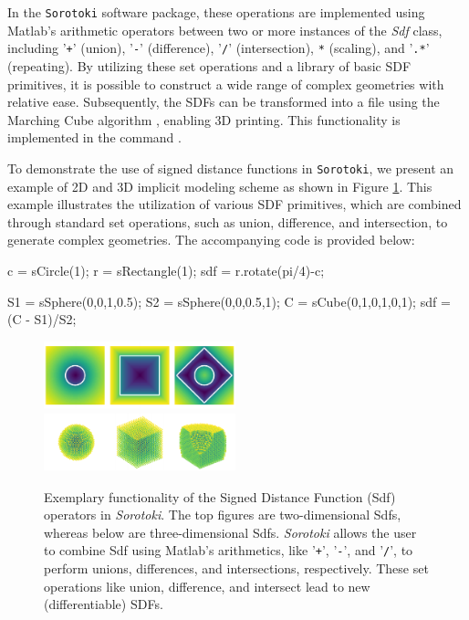 In the \texttt{Sorotoki} software package, these operations are implemented using Matlab's arithmetic operators between two or more instances of the \textit{Sdf} class, including '\texttt{+}' (union), '\texttt{-}' (difference), '\texttt{/}' (intersection), \texttt{*} (scaling), and '\texttt{.*}' (repeating). By utilizing these set operations and a library of basic SDF primitives, it is possible to construct a wide range of complex geometries with relative ease. Subsequently, the SDFs can be transformed into a  file using the Marching Cube algorithm \cite{Lorensen1987Aug}, enabling 3D printing. This functionality is implemented in the command . \\

\begin{example}
To demonstrate the use of signed distance functions in \texttt{Sorotoki}, we present an example of 2D and 3D implicit modeling scheme as shown in Figure \ref{fig:C5:sdfexample}. This example illustrates the utilization of various SDF primitives, which are combined through standard set operations, such as union, difference, and intersection, to generate complex geometries. The accompanying code is provided below:
\end{example}

\begin{matlabcode}
c   = sCircle(1);
r   = sRectangle(1);
sdf = r.rotate(pi/4)-c;

S1  = sSphere(0,0,1,0.5);
S2  = sSphere(0,0,0.5,1);
C   = sCube(0,1,0,1,0,1);
sdf = (C - S1)/S2;
\end{matlabcode}

\begin{figure}[!t]
\centering
\includegraphics*[width=0.495\textwidth]{./pdf/thesis-figure-6-3-1.pdf}
\includegraphics*[width=0.495\textwidth]{./pdf/thesis-figure-6-3-2.pdf}
%
\caption{Exemplary functionality of the Signed Distance Function (Sdf) operators in \textit{Sorotoki}. The top figures are two-dimensional Sdfs, whereas below are three-dimensional Sdfs. \textit{Sorotoki} allows the user to combine Sdf using Matlab's arithmetics, like '\texttt{+}', '\texttt{-}', and '\texttt{/}', to perform unions, differences, and intersections, respectively. These set operations like union, difference, and intersect lead to new (differentiable) SDFs.\label{fig:C5:sdfexample}}
\vspace{-3mm}
\end{figure}

